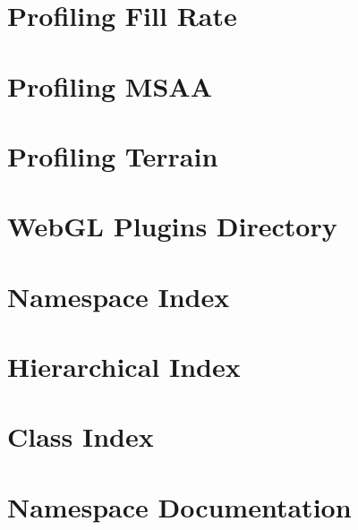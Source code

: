 \documentclass[twoside]{book}
\newcommand{\+}{\discretionary{\mbox{\scriptsize$\hookleftarrow$}}{}{}}
\begin{document}
\chapter{Profiling Fill Rate}
\label{_page_profiling_fill_rate}

\chapter{Profiling MSAA}
\label{_page_profiling_m_s_a_a}

\chapter{Profiling Terrain}
\label{_page_profiling_terrain}

\chapter{Web\+GL Plugins Directory}
\label{md__e___business__projects__o8_c__verse__verse____web_g_l__assets___o8_c_system___scripts__syste26b9807ee5d3bbcaf86da09a95c0a6d1}

\chapter{Namespace Index}

\chapter{Hierarchical Index}

\chapter{Class Index}

\chapter{Namespace Documentation}




\end{document}
